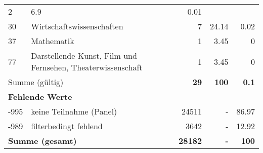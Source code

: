 \begin{longtable}{lXrrr}
       \num{2} &
       \num[round-mode=places,round-precision=2]{6.9} &
         \num[round-mode=places,round-precision=2]{0.01} \\

     30 &
     \multicolumn{1}{X}{ Wirtschaftswissenschaften   } &


       \num{7} &
       \num[round-mode=places,round-precision=2]{24.14} &
         \num[round-mode=places,round-precision=2]{0.02} \\

     37 &
     \multicolumn{1}{X}{ Mathematik   } &


       \num{1} &
       \num[round-mode=places,round-precision=2]{3.45} &
         \num[round-mode=places,round-precision=2]{0} \\

     77 &
     \multicolumn{1}{X}{ Darstellende Kunst, Film und Fernsehen, Theaterwissenschaft   } &


       \num{1} &
       \num[round-mode=places,round-precision=2]{3.45} &
         \num[round-mode=places,round-precision=2]{0} \\
     \midrule
     \multicolumn{2}{l}{Summe (gültig)} &
       \textbf{\num{29}} &
     \textbf{\num{100}} &
       \textbf{\num[round-mode=places,round-precision=2]{0.1}} \\
     \multicolumn{5}{l}{\textbf{Fehlende Werte}}\\
       -995 &
       keine Teilnahme (Panel) &
         \num{24511} &
        - &
         \num[round-mode=places,round-precision=2]{86.97} \\
       -989 &
       filterbedingt fehlend &
         \num{3642} &
        - &
         \num[round-mode=places,round-precision=2]{12.92} \\
     \midrule
     \multicolumn{2}{l}{\textbf{Summe (gesamt)}} &
          \textbf{\num{28182}} &
        \textbf{-} &
        \textbf{\num{100}} \\
     \bottomrule
     \end{longtable}
     
